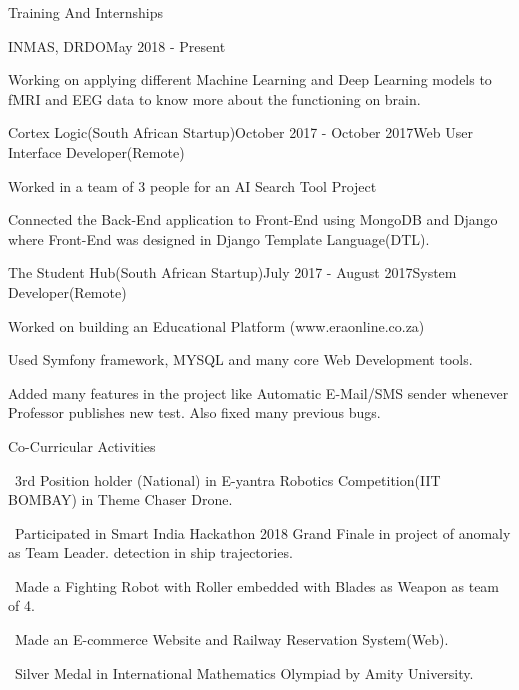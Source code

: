 \documentclass{resume} %
\begin{document}
\begin{rSection}{Training And Internships}

\begin{rSubsection}{INMAS, DRDO}{May 2018 - Present}{}{}
\item Working on applying different Machine Learning and Deep Learning models to fMRI and EEG data to know more about the functioning on brain.
\end{rSubsection}



\begin{rSubsection}{Cortex Logic(South African Startup)}{October 2017 - October 2017}{Web User Interface Developer(Remote)}{}
\item Worked in a team of 3 people for an AI Search Tool Project
\item Connected the Back-End application to Front-End using MongoDB and Django where Front-End was designed in Django Template Language(DTL).
\end{rSubsection}


\begin{rSubsection}{The Student Hub(South African Startup)}{July 2017 - August 2017}{System Developer(Remote)}{}
	\item Worked on building an Educational Platform (www.eraonline.co.za)
	\item Used Symfony framework, MYSQL and many core Web Development tools.
	\item Added many features in the project like Automatic E-Mail/SMS sender
	whenever Professor publishes new test. Also fixed many previous bugs.
\\	
\end{rSubsection}

\end{rSection}


\begin{rSection}{Co-Curricular Activities} \itemsep -2pt
\item \textbullet \ 3rd Position holder (National) in E-yantra Robotics Competition(IIT BOMBAY)
in Theme Chaser Drone.
\item \textbullet \ Participated in Smart India Hackathon 2018 Grand Finale in project of anomaly as Team Leader.
detection in ship trajectories.
\item \textbullet \ Made a Fighting Robot with Roller embedded with Blades as Weapon as team of 4.
\item \textbullet \ Made an E-commerce Website and Railway Reservation System(Web).
\item \textbullet \ Silver Medal in International Mathematics Olympiad by Amity University.
\end{rSection}
\end{document}

